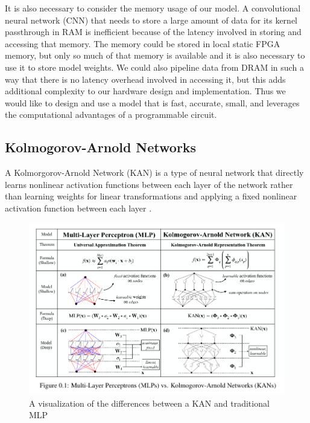 \documentclass{article}
\newcommand{\mycomment}[1]{}
\begin{document}
It is also necessary to consider the memory usage of our model. A convolutional neural network (CNN) that needs to store a large amount of data for its kernel passthrough in RAM is inefficient because of the latency involved in storing and accessing that memory. The memory could be stored in local static FPGA memory\mycomment{what is a better name for this?}, but only so much of that memory is available and it is also necessary to use it to store model weights. We could also pipeline data from DRAM in such a way that there is no latency overhead involved in accessing it, but this adds additional complexity to our hardware design and implementation. Thus we would like to design and use a model that is fast, accurate, small, and leverages the computational advantages of a programmable circuit.

\subsection{Kolmogorov-Arnold Networks}
A Kolmorgorov-Arnold Network (KAN) is a type of neural network that directly learns nonlinear activation functions between each layer of the network rather than learning weights for linear transformations and applying a fixed nonlinear activation function between each layer \cite{kan}.

\begin{figure}[H]
\centering
\includegraphics[scale=0.5]{mlpkan.png}
\caption{A visualization of the differences between a KAN and traditional MLP \cite{kan}}
\end{figure}
\end{document}
